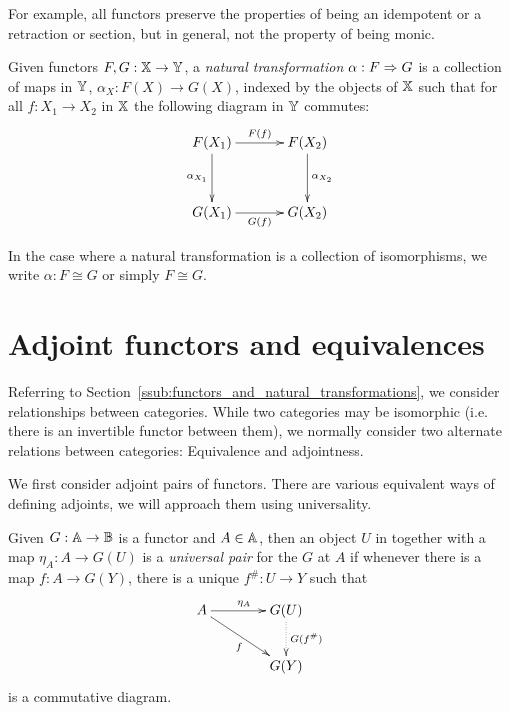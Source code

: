 For example, all functors preserve the properties of being an idempotent or a retraction or section,
but in general, not the property of being monic.

\begin{definition}\label{def:natural_transformation}
  Given functors $F,G:\mathbb{X} \to \mathbb{Y}$, a \emph{natural transformation} $\alpha:F \Rightarrow G$ is a collection
  of maps in $\mathbb{Y}$, $\alpha_X : F(X) \to G(X)$, indexed by the objects of $\mathbb{X}$ such that for all
  $f:X_1 \to X_2$ in $\mathbb{X}$ the following diagram in $\mathbb{Y}$ commutes:
  \[\xymatrix @R+10pt @C+10pt{
      F(X_1) \ar[r]^{F(f)} \ar[d]_{\alpha_{X_1}} & F(X_2) \ar[d]^{\alpha_{X_2}}\\
      G(X_1) \ar[r]_{G(f)} &  G(X_2)
    }
  \]
\end{definition}

In the case where a natural transformation is a collection of isomorphisms, we write $\alpha: F
\cong G$ or simply $F\cong G$.



\section{Adjoint functors and equivalences}
\label{sec:adjoint-functors-and-equivalences}

Referring to Section~\ref{ssub:functors_and_natural_transformations}, we consider relationships
between categories. While two categories may be isomorphic (i.e. there is an invertible functor
between them), we normally consider two alternate relations between categories: Equivalence and
adjointness.

We first consider adjoint pairs of functors. There are various equivalent ways of defining adjoints,
we will approach them using universality.

\begin{definition}\label{def:universal_pair}
  Given $G:\mathbb{A}\to\mathbb{B}$ is a functor and $A\in \mathbb{A}$, then an object $U$ in \B together with a map
  $\eta_A:A\to G(U)$ is a \emph{universal pair} for the $G$ at $A$ if whenever there is a map
  $f:A\to G(Y)$, there is a unique $f^{\#}:U\to Y$ such that
  \[
    \xymatrix@C+15pt{
      A \ar[r]^{\eta_A} \ar[dr]_{f} & G(U) \ar@{.>}[d]^{G(f^{\#})}\\
      & G(Y)
    }
  \]
  is a commutative diagram.
\end{definition}

